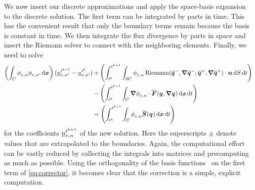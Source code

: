 We now insert our discrete approximations and apply the space-basis expansion~ to the discrete solution.
The first term can be integrated by parts in time.
This has the convenient result that only the boundary terms remain because the basis is constant in time.
We then integrate the flux divergence by parts in space and insert the Riemann solver to connect with the neighboring elements.
Finally, we need to solve
\newcommand{\massMatrixDef}{\intdcell{
  \stestfunction[][v,n] \sbasis[][v,n']
}}%
\begin{align}
\begin{split}
\label{eq:corrector}
\left(
\massMatrixDef
\right)
(\ssolCoeff[\nextTime][v,n'] - \ssolCoeff[\curTime][v,n'])
&+
\left(\intdt{\intdcellb{
      \stestfunction[][v,n] \Riemann(\stpredictor[-], \gradient{\stpredictor[-]}; \stpredictor[+], \gradient{\stpredictor[+]}) \cdot \normal
}}\right)
\\&-
\left(\intdt{\intdcell{
    \gradient{\stestfunction[][v,n]} \cdot  \stflux(\spredictor, \gradient{\spredictor})
}}\right)
\\&=
\left(\intdt{\intdcell{
      \stestfunction[][v,n] \stsource(\spredictor)
}}\right)
\end{split}\raisetag{0.8cm}
\end{align}
for the coefficients $\ssolCoeff[\nextTime][v,n]$ of the new solution.
Here the superscripts $\pm$ denote values that are extrapolated to the boundaries.
Again, the computational effort can be vastly reduced by collecting the integrals into matrices and precomputing as much as possible.
Using the orthogonality of the basis functions~ on the first term of \cref{eq:corrector}, it becomes clear that the correction is a simple, explicit computation.

